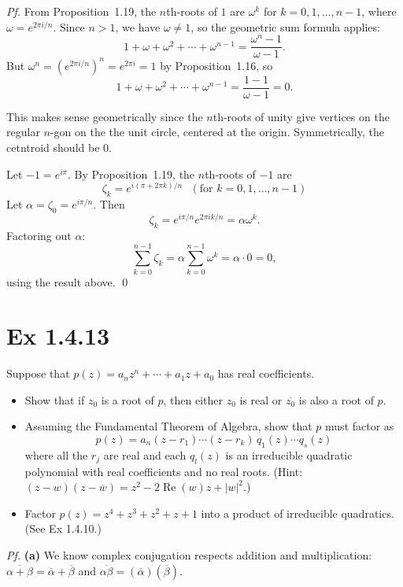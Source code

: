 \documentclass[a4paper]{article}
\begin{document}
\textit{Pf.} From Proposition~1.19, the $n$th-roots of $1$ are $\omega^k$ for $k = 0, 1, \ldots, n-1$, where $\omega = e^{2\pi i/n}$.  Since $n > 1$, we have $\omega \neq 1$, so the geometric sum formula applies:
\[
1 + \omega + \omega^2 + \cdots + \omega^{n-1} = \frac{\omega^n - 1}{\omega - 1}.
\]
But $\omega^n = (e^{2\pi i/n})^n = e^{2\pi i} = 1$ by Proposition~1.16, so
\[
1 + \omega + \omega^2 + \cdots + \omega^{n-1} = \frac{1 - 1}{\omega - 1} = 0.
\]

This makes sense geometrically since the $n$th-roots of unity give vertices on the regular $n$-gon on the the unit circle, centered at the origin. Symmetrically, the cetntroid should be 0.

\medskip\noindent
Let $-1 = e^{i\pi}$.  By Proposition~1.19, the $n$th-roots of $-1$ are
\[
\zeta_k = e^{i(\pi + 2\pi k)/n} \text{ }(\text{for } k = 0, 1, \ldots, n-1)
\]
Let $\alpha = \zeta_0 = e^{i\pi/n}$.  Then
\[
\zeta_k = e^{i\pi/n} e^{2\pi ik/n} = \alpha\omega^k.
\]
Factoring out $\alpha$:
\[
\sum_{k=0}^{n-1} \zeta_k = \alpha\sum_{k=0}^{n-1}\omega^k = \alpha\cdot 0 = 0,
\]
using the result above. \qed

\newpage
\section*{Ex 1.4.13}

\begin{tcolorbox}[colback=gray!10, colframe=black, boxrule=0.5pt, arc=2mm]
Suppose that $p(z) = a_n z^n + \cdots + a_1 z + a_0$ has real coefficients.
\begin{itemize}
\item[(a)] Show that if $z_0$ is a root of $p$, then either $z_0$ is real or $\overline{z_0}$ is also a root of $p$.
\item[(b)] Assuming the Fundamental Theorem of Algebra, show that $p$ must factor as
\[
p(z) = a_n(z - r_1)\cdots(z - r_k)\,q_1(z)\cdots q_s(z)
\]
where all the $r_j$ are real and each $q_l(z)$ is an irreducible quadratic polynomial with real coefficients and no real roots. (Hint: $(z-w)(z-\overline{w}) = z^2 - 2\operatorname{Re}(w)z + |w|^2$.)
\item[(c)] Factor $p(z) = z^4 + z^3 + z^2 + z + 1$ into a product of irreducible quadratics. (See Ex 1.4.10.)
\end{itemize}
\end{tcolorbox}

\textit{Pf.} \textbf{(a)}
We know complex conjugation respects addition and multiplication: $\overline{\alpha+\beta} = \overline{\alpha}+\overline{\beta}$ and $\overline{\alpha\beta} = (\overline{\alpha})(\overline{\beta})$.  
\medskip
\end{document}
